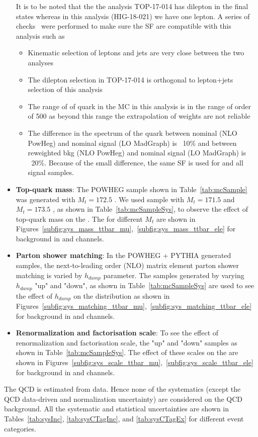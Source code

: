 \begin{itemize}
    It is to be noted that the the analysis TOP-17-014 has dilepton in
    the final states whereas in this analysis (HIG-18-021) we have one
    lepton. A series of checks~\cite{ref:topPt} were performed to make 
    sure the SF are compatible with this analysis such as 
    \begin{itemize}
    \item 
    Kinematic selection of leptons and jets are very close between 
    the two analyses
    \item 
    The dilepton selection in TOP-17-014 is orthogonal to lepton+jets 
    selection of this analysis
    \item 
    The range of \pt of \PQt quark in the \ttbar MC in this analysis 
    is in the range of order of 500 \GeV as beyond this range the 
    extrapolation of weights are not reliable
    \item 
    The difference in the \pt spectrum of the \PQt quark between 
    nominal \ttbar (NLO PowHeg) and nominal signal (LO MadGraph) is 
    ~10\% and between reweighted \ttbar bkg (NLO PowHeg) and nominal 
    signal (LO MadGraph) is ~20\%. Because of the small difference, 
    the same SF is used for \ttbar and all signal samples.
    \end{itemize}

\item {\bf Top-quark mass}: The POWHEG \ttjets sample shown in Table~\ref{tab:mcSample} was 
    generated with $M_{t} =172.5$ \GeV. We used \ttjets sample with $M_{t} =171.5$ 
    \GeV and $M_{t} =173.5$ \GeV, as shown in Table~\ref{tab:mcSampleSys}, to observe the 
    effect of top-quark mass on the \mjj. The \mjj for different $M_t$ are shown  
    in Figures~\ref{subfig:sys_mass_ttbar_mu},~\ref{subfig:sys_mass_ttbar_ele}
    for \ttjets background in \mujets and \ejets channels. 

\item {\bf Parton shower matching}: In the POWHEG + PYTHIA generated samples, the 
    next-to-leading order (NLO) matrix element parton shower matching is varied by $h_{damp}$
    parameter. The \ttjets samples generated by varying $h_{damp}$ "up" and 
    "down", as shown in Table~\ref{tab:mcSampleSys} are used to see the effect of $h_{damp}$ 
    on the \mjj distribution as shown  
    in Figures~\ref{subfig:sys_matching_ttbar_mu},~\ref{subfig:sys_matching_ttbar_ele}
    for \ttjets background in \mujets and \ejets channels. 

\item {\bf Renormalization and factorisation scale}: To see the effect of renormalization and factorisation
    scale, the "up" and "down" \ttjets samples as shown in Table~\ref{tab:mcSampleSys}. The effect
    of these scales on the \mjj are shown 
    in Figures~\ref{subfig:sys_scale_ttbar_mu},~\ref{subfig:sys_scale_ttbar_ele}
    for \ttjets background in \mujets and \ejets channels. 
\end{itemize}
The QCD is estimated from data. Hence none of the systematics (except the QCD data-driven and 
normalization uncertainty) are considered on the QCD background. All the systematic
and statistical uncertainties are shown in Tables~\ref{tab:sysInc}, \ref{tab:sysCTagInc}, 
and \ref{tab:sysCTagEx} for different event categories.


